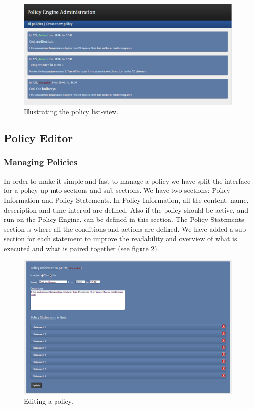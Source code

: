 \begin{figure}[ht]
\centering
\includegraphics[width=\columnwidth]{policylist.png}
\caption{Illustrating the policy list-view.}
\label{fig:policylist}
\end{figure}

\subsection{Policy Editor}

\subsubsection{Managing Policies}
In order to make it simple and fast to manage a policy we have split the interface for a policy up into sections and sub sections. We have two sections: Policy Information and Policy Statements. In Policy Information, all the content: name, description and time interval are defined. Also if the policy should be active, and run on the Policy Engine, can be defined in this section. The Policy Statements section is where all the conditions and actions are defined. We have added a sub section for each statement to improve the readability and overview of what is executed and what is paired together (see figure \ref{fig:policy}).  

\begin{figure}[ht]
\centering
\includegraphics[width=\columnwidth]{policy.png}
\caption{Editing a policy.}
\label{fig:policy}
\end{figure}

